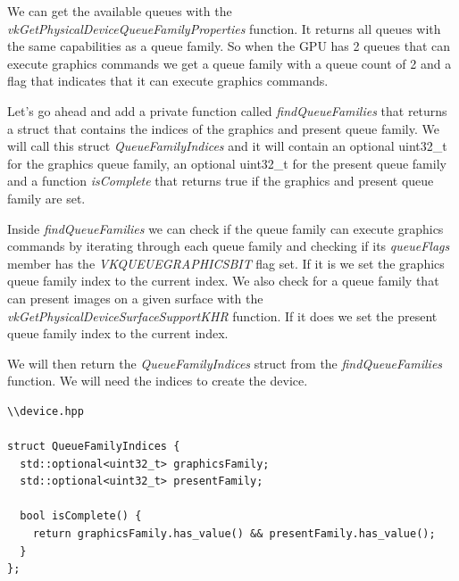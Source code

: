 \documentclass[12pt]{report} \usepackage{preamble}
\begin{document}
We can get the available queues with the \textit{vkGetPhysicalDeviceQueueFamilyProperties} function.
It returns all queues with the same capabilities as a queue family. So when the \ac{GPU} has 2 queues
that can execute graphics commands we get a queue family with a queue count of 2 and a flag that
indicates that it can execute graphics commands.

Let's go ahead and add a private function called \textit{findQueueFamilies} that returns a struct
that contains the indices of the graphics and present queue family. We will call this struct
\textit{QueueFamilyIndices} and it will contain an optional uint32\_t for the graphics queue family,
an optional uint32\_t for the present queue family and a function \textit{isComplete} that returns
true if the graphics and present queue family are set.

Inside \textit{findQueueFamilies} we can check if the queue family can execute graphics commands by iterating through each queue family
and checking if its \textit{queueFlags} member has the \textit{VK\textunderscore QUEUE\textunderscore GRAPHICS\textunderscore BIT} flag set.
If it is we set the graphics queue family index to the current index. We also check for a queue family that can present images
on a given surface with the \textit{vkGetPhysicalDeviceSurfaceSupportKHR} function. If it does we set the present queue family index
to the current index.

We will then return the \textit{QueueFamilyIndices} struct from the \textit{findQueueFamilies} function. We will need the indices
to create the device.

\begin{lstlisting}[Language=C++]
\\device.hpp

struct QueueFamilyIndices {
  std::optional<uint32_t> graphicsFamily;
  std::optional<uint32_t> presentFamily;

  bool isComplete() {
    return graphicsFamily.has_value() && presentFamily.has_value();
  }
};
\end{lstlisting}
\end{document}
